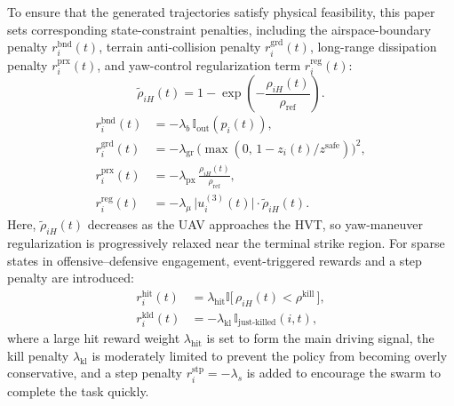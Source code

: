 \documentclass{cja}
\begin{document}
To ensure that the generated trajectories satisfy physical feasibility, this paper sets corresponding state-constraint penalties, including the airspace-boundary penalty $r_i^{\mathrm{bnd}}(t)$, terrain anti-collision penalty $r_i^{\mathrm{grd}}(t)$, long-range dissipation penalty $r_i^{\mathrm{prx}}(t)$, and yaw-control regularization term $r_i^{\mathrm{reg}}(t)$:
\begin{equation}
\widetilde\rho_{iH}(t)
=
1-
\exp\!\left(-\frac{\rho_{iH}(t)}{\rho_{\mathrm{ref}}}\right).
\end{equation}
\begin{align}
r_i^{\mathrm{bnd}}(t)&=-\lambda_b\,\mathbb{I}_{\mathrm{out}}(p_i(t)),
\label{eq:r-bnd}\\
r_i^{\mathrm{grd}}(t)&=-\lambda_{\mathrm{gr}}\,\bigl(\max(0,\,1-z_i(t)/z^{\mathrm{safe}})\bigr)^{2},
\label{eq:r-grd}\\
r_i^{\mathrm{prx}}(t)&=-\lambda_{\mathrm{px}}\,\frac{\rho_{iH}(t)}{\rho_{\mathrm{ref}}},
\label{eq:r-prx}\\
r_i^{\mathrm{reg}}(t)&=-\lambda_{\mu}\,\bigl|u_i^{(3)}(t)\bigr|\cdot \widetilde\rho_{iH}(t).
\label{eq:r-reg}
\end{align}
Here, $\widetilde\rho_{iH}(t)$ decreases as the UAV approaches the HVT, so yaw-maneuver regularization is progressively relaxed near the terminal strike region. For sparse states in offensive--defensive engagement, event-triggered rewards and a step penalty are introduced:
\begin{equation}
\begin{aligned}
r_i^{\mathrm{hit}}(t)
&=\lambda_{\mathrm{hit}}\mathbb{I}\bigl[\,\rho_{iH}(t)<\rho^{\mathrm{kill}}\,\bigr],\\
r_i^{\mathrm{kld}}(t)
&=-\lambda_{\mathrm{kl}}\,\mathbb{I}_{\text{just-killed}}(i,t),
\end{aligned}
\label{eq:r-event}
\end{equation}
where a large hit reward weight $\lambda_{\mathrm{hit}}$ is set to form the main driving signal, the kill penalty $\lambda_{\mathrm{kl}}$ is moderately limited to prevent the policy from becoming overly conservative, and a step penalty $r_i^{\mathrm{stp}}=-\lambda_s$ is added to encourage the swarm to complete the task quickly.
\end{document}
